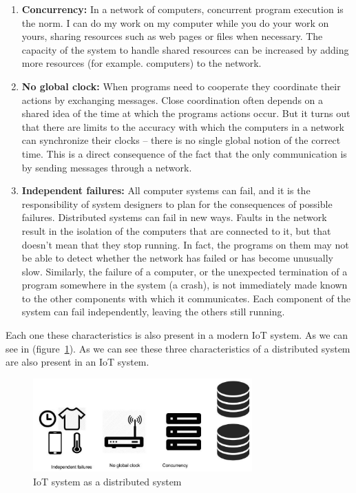 \begin{enumerate}

\item \textbf{Concurrency:}
In a network of computers, concurrent program execution is the norm. I can
do my work on my computer while you do your work on yours, sharing resources
such as web pages or files when necessary. The capacity of the system to handle
shared resources can be increased by adding more resources (for example.
computers) to the network.

\item \textbf{No global clock:}
When programs need to cooperate they coordinate their actions
by exchanging messages. Close coordination often depends on a shared idea of
the time at which the programs actions occur. But it turns out that there are
limits to the accuracy with which the computers in a network can synchronize
their clocks – there is no single global notion of the correct time. This is a
direct consequence of the fact that the only communication is by sending
messages through a network.

\item \textbf{Independent failures:}
All computer systems can fail, and it is the
responsibility of system designers to plan for the consequences of possible
failures. Distributed systems can fail in new ways. Faults in the network
result in the isolation of the computers that are connected to it, but that
doesn’t mean that they stop running. In fact, the programs on them may not be
able to detect whether the network has failed or has become unusually slow.
Similarly, the failure of a computer, or the unexpected termination of a
program somewhere in the system (a crash), is not immediately made known to the
other components with which it communicates. Each component of the system can
fail independently, leaving the others still running.

\end{enumerate}


Each one these characteristics is also present in a modern IoT system. As we can
see in (figure~\ref{fig:3.1}). As we can see these three characteristics of a
distributed system are also present in an IoT system. 

\begin{figure}[H]
\centering
\includegraphics[width=0.75\textwidth]{images/IoT_distributed.jpg}
\caption{IoT system as a distributed system}
\label{fig:3.1}
\end{figure}


